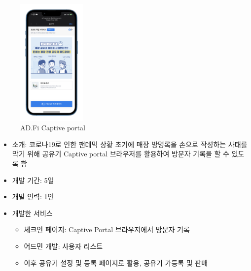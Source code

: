 \begin{itemize}[label=]
\begin{itemize}[label=]
\begin{figure}[!ht]
\begin{fullwidth}
{					            \includegraphics[width=0.3\textwidth]{images/ad-fi-reward.png}
					            \caption*{AD.Fi Captive portal}
				            }
			            \end{fullwidth}
		            \end{figure}
	      \end{itemize}

\end{itemize}


\begin{itemize}[label=]
	\item 소개: 코로나19로 인한 팬데믹 상황 초기에 매장 방명록을 손으로 작성하는 사태를 막기 위해 공유기 Captive portal 브라우저를 활용하여 방문자 기록을 할 수 있도록 함
	\item 개발 기간: 5일
	\item 개발 인력: 1인
	\item 개발한 서비스
	      \begin{itemize}[label=]
		      \item 체크인 페이지: Captive Portal 브라우저에서 방문자 기록
		      \item 어드민 개발: 사용자 리스트
		      \item 이후 공유기 설정 및 등록 페이지로 활용, 공유기 가등록 및 판매
	      \end{itemize}
\end{itemize}



